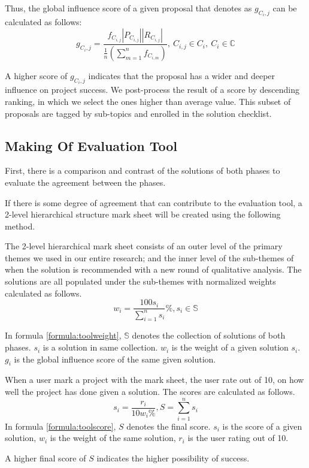 Thus, the global influence score of a given proposal that denotes as $g_{C_{i},j}$ can be calculated as follows:
\begin{equation}
g_{C_{i},j} =
\frac
{f_{C_{i,j}} |P_{C_{i,j}}| |R_{C_{i,j}}|} 
{\frac{1}{n}\left (\sum_{m=1}^n{f_{C_{i,m}}}\right)}
,\ 
C_{i,j} \in C_{i},\ C_{i} \in \mathbb{C}
\label{final}
\end{equation}

A higher score of $g_{C_{i},j}$ indicates that the proposal has a wider and deeper influence on project success. We post-process the result of a score by descending ranking, in which we select the ones higher than average value. This subset of proposals are tagged by sub-topics and enrolled in the solution checklist.

\subsection{Making Of Evaluation Tool}

First, there is a comparison and contrast of the solutions of both phases to evaluate the agreement between the phases.

If there is some degree of agreement that can contribute to the evaluation tool, a 2-level hierarchical structure mark sheet will be created using the following method.

The 2-level hierarchical mark sheet consists of an outer level of the primary themes we used in our entire research; and the inner level of the sub-themes of when the solution is recommended with a new round of qualitative analysis. The solutions are all populated under the sub-themes with normalized weights calculated as follows.
\begin{equation}
w_i = \frac{100s_i}{\sum_{i=1}^n{s_i}}\%, s_i \in \mathbb{S}
\label{formula:toolweight}
\end{equation}

In formula \ref{formula:toolweight}, $\mathbb{S}$ denotes the collection of solutions of both phases. $s_i$ is a solution in same collection. $w_i$ is the weight of a given solution $s_i$. $g_i$ is the global influence score of the same given solution.


When a user mark a project with the mark sheet, the user rate out of 10, on how well the project has done given a solution. The scores are calculated as follows.
\begin{equation}
s_i = \frac{r_i}{10w_i\%}, S = \sum_{i=1}^n{s_i}
\label{formula:toolscore}
\end{equation}
In formula \ref{formula:toolscore}, $S$ denotes the final score. $s_i$ is the score of a given solution, $w_i$ is the weight of the same solution, $r_i$ is the user rating out of 10.

A higher final score of $S$ indicates the higher possibility of success.
